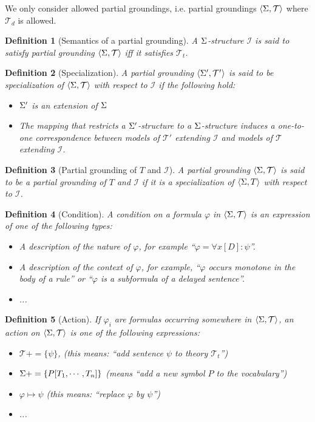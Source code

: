 \documentclass{article}
\newcommand{\I}{\mathcal{I}}
\newcommand{\seq}[1]{\left\langle#1\right\rangle}
\newcommand{\vocc}{\voc'}
\newcommand{\T}{\mathcal{T}}
\newcommand{\Tt}{\mathcal{T}_t}
\newcommand{\Td}{\mathcal{T}_d}
\newcommand{\pg}{\seq{\voc,\T}}
\newcommand{\pgg}{\seq{\voc',\T'}}
\newtheorem{definition}{Definition}
\begin{document}
We only consider allowed partial groundings, i.e. partial groundings $\pg$ where $\Td$ is allowed.

\begin{definition}[Semantics of a partial grounding]
	A $\Sigma$-structure $\I$ is said to satisfy partial grounding $\pg$ iff it satisfies $\Tt$.
\end{definition}

\begin{definition}[Specialization]
	A partial grounding $\pgg$ is said to be specialization of $\pg$ with respect to $\I$ if the following hold:
\begin{itemize}
	\item $\vocc$ is an extension of $\Sigma$
	\item The mapping that restricts a $\vocc$-structure to a $\Sigma$-structure induces a one-to-one correspondence between models of $\T'$ extending $\I$ and models of $\T$ extending $\I$.
\end{itemize}
\end{definition}

\begin{definition}[Partial grounding of $T$ and $\I$]
	A partial grounding $\pg$ is said to be a partial grounding of $T$ and $\I$ if it is a specialization of $\seq{\voc,T}$ with respect to $\I$.
\end{definition}



\begin{definition}[Condition]
A condition on a formula $\varphi$ in $\pg$ is an expression of one of the following types:
\begin{itemize}
	\item A description of the nature of $\varphi$, for example ``$\varphi = \forall x[D]: \psi$''.
	\item A description of the context of $\varphi$, for example, ``$\varphi$ occurs monotone in the body of a rule'' or ``$\varphi$ is a subformula of a delayed sentence''.
	\item ...
\end{itemize}
\end{definition}

\begin{definition}[Action]
	If $\varphi_i$ are formulas occurring somewhere in $\pg$, an action on $\pg$ is one of the following expressions:
\begin{itemize}
	\item $\T += \{\psi\}$, (this means: ``add sentence $\psi$ to theory $\Tt$'')
	\item $\Sigma +=\{P[T_1,\cdots,T_n]\}$ (means ``add a new symbol $P$ to the vocabulary'')
	\item $\varphi \mapsto \psi$ (this means: ``replace $\varphi$ by $\psi$'')
    \item ...
\end{itemize}

\end{definition}
\end{document}
